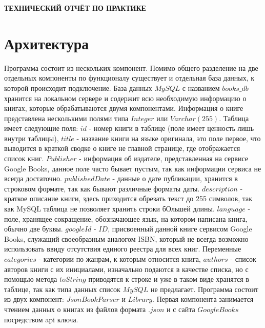 \begin{center}
\bfseries{\large ТЕХНИЧЕСКИЙ ОТЧЁТ ПО ПРАКТИКЕ}
\end{center}

\section*{Архитектура}
Программа состоит из нескольких компонент. Помимо общего разделение на две отдельных компоненты по функционалу существует и отдельная база данных, к которой происходит подключение.
\newline База данных $MySQL$ с названием $books\_db$ хранится на локальном сервере и содержит всю необходимую информацию о книгах, которые обрабатываются двумя компонентами. Информация о книге представлена несколькими полями типа $Integer$ или $Varchar(255)$. Таблица имеет следующие поля: $id$ - номер книги в таблице (поле имеет ценность лишь внутри таблицы), $title$ - название книги на языке оригинала, это поле первое, что выводится в краткой сводке о книге не главной странице, где отображается список книг. $Publisher$ - информация об издателе, представленная на сервисе Google Books, данное поле часто бывает пустым, так как информации  сервиса не всегда достаточно. $publishedDate$ - данные о дате публикации, хранится в строковом формате, так как бывают различные форматы даты. $description$ - краткое описание книги, здесь приходится обрезать текст до 255 символов, так как MySQL таблица не позволяет хранить строки бОльшей длины. $language$ - поле, хранящее сокращение, обозначающее язык, на котором написана книга, обычно две буквы. $googleId$ - $ID$, присвоенный данной книге сервисом Google Books, служащий своеобразным аналогом ISBN, который не всегда возможно использовать ввиду отсутствия единого реестра для всех книг. Переменные $categories$ - категории по жанрам, к которым относится книга, $authors$ - список авторов книги с их инициалами, изначально подаются в качестве списка, но с помощью метода $toString$ приводятся к строке и уже в таком виде хранятся в таблице, так как типа данных $список$ $MySQL$ не предлагает.
\newline Программа состоит из двух компонент: $JsonBookParser$ и $Library$.
\newline \newline Первая компонента занимается чтением данных о книгах из файлов формата $.json$ и с сайта $Google Books$ посредством api ключа.
